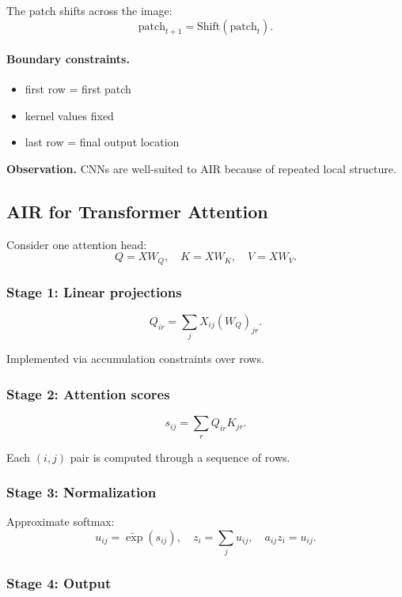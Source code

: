 The patch shifts across the image:
\[
\text{patch}_{t+1} = \text{Shift}(\text{patch}_t).
\]

\paragraph{Boundary constraints.}

\begin{itemize}
\item first row = first patch
\item kernel values fixed
\item last row = final output location
\end{itemize}

\medskip

\noindent
\textbf{Observation.}  
CNNs are well-suited to AIR because of repeated local structure.

\subsection{AIR for Transformer Attention}

Consider one attention head:
\[
Q = XW_Q,\quad K = XW_K,\quad V = XW_V.
\]

\subsubsection{Stage 1: Linear projections}

\[
Q_{ir} = \sum_j X_{ij} (W_Q)_{jr}.
\]

Implemented via accumulation constraints over rows.

\subsubsection{Stage 2: Attention scores}

\[
s_{ij} = \sum_r Q_{ir} K_{jr}.
\]

Each $(i,j)$ pair is computed through a sequence of rows.

\subsubsection{Stage 3: Normalization}

Approximate softmax:
\[
u_{ij} = \widetilde{\exp}(s_{ij}),\quad
z_i = \sum_j u_{ij},\quad
a_{ij} z_i = u_{ij}.
\]

\subsubsection{Stage 4: Output}


